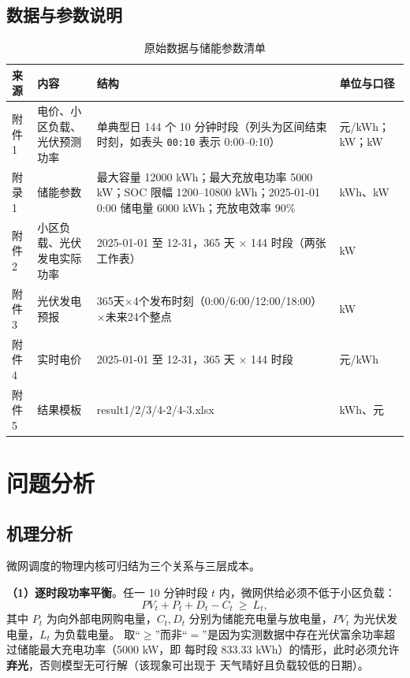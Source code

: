 \documentclass[withoutpreface,bwprint]{cumcmthesis}
\begin{document}
\subsection{数据与参数说明}

\begin{table}[htbp]
\centering
\caption{原始数据与储能参数清单}
\label{tab:data}
\begin{tabularx}{\textwidth}{@{}p{1.3cm}p{2.6cm}p{7.8cm}X@{}}
\toprule
来源 & 内容 & 结构 & 单位与口径 \\
\midrule
附件1 & 电价、小区负载、光伏预测功率 & 单典型日 144 个 10 分钟时段（列头为区间结束时刻，如表头 \texttt{00:10} 表示 0:00--0:10） & 元/kWh；kW；kW \\
附录1 & 储能参数 & 最大容量 12000 kWh；最大充放电功率 5000 kW；SOC 限幅 1200--10800 kWh；2025-01-01 0:00 储电量 6000 kWh；充放电效率 90\% & kWh、kW \\
附件2 & 小区负载、光伏发电实际功率 & 2025-01-01 至 12-31，365 天 $\times$ 144 时段（两张工作表） & kW \\
附件3 & 光伏发电预报 & 365天$\times$4个发布时刻（0:00/6:00/12:00/18:00）$\times$未来24个整点 & kW \\
附件4 & 实时电价 & 2025-01-01 至 12-31，365 天 $\times$ 144 时段 & 元/kWh \\
附件5 & 结果模板 & result1/2/3/4-2/4-3.xlsx & kWh、元 \\
\bottomrule
\end{tabularx}
\end{table}



\section{问题分析}

\subsection{机理分析}

微网调度的物理内核可归结为三个关系与三层成本\cite{ieee_tou,thu_ess}。

\textbf{（1）逐时段功率平衡}。任一 10 分钟时段 $t$ 内，微网供给必须不低于小区负载：
\begin{equation}
PV_t + P_t + D_t - C_t \ \ge\ L_t ,
\label{eq:balance_general}
\end{equation}
其中 $P_t$ 为向外部电网购电量，$C_t,D_t$ 分别为储能充电量与放电量，$PV_t$ 为光伏发电量，$L_t$ 为负载电量。
取“$\ge$”而非“$=$”是因为实测数据中存在光伏富余功率超过储能最大充电功率（5000 kW，即
每时段 833.33 kWh）的情形，此时必须允许\textbf{弃光}，否则模型无可行解（该现象可出现于
天气晴好且负载较低的日期）。
\end{document}
